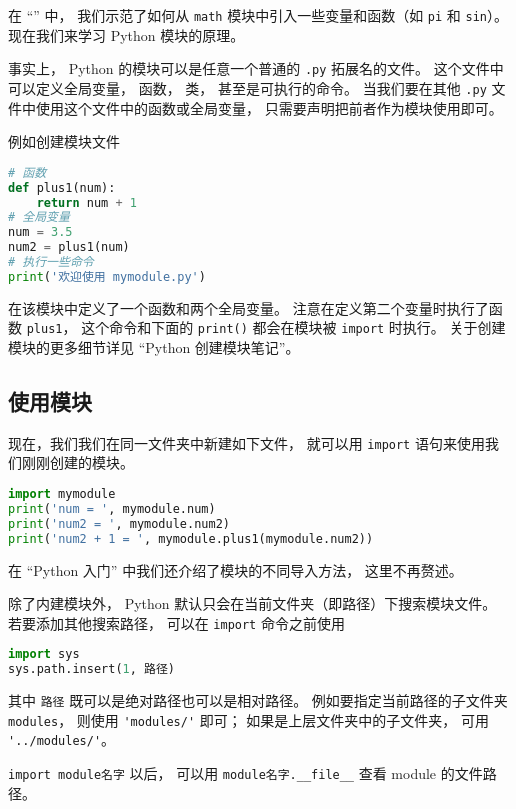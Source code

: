 

在 “” 中， 我们示范了如何从 \verb|math| 模块中引入一些变量和函数（如 \verb|pi| 和 \verb|sin|）。 现在我们来学习 Python 模块的原理。

事实上， Python 的模块可以是任意一个普通的 \verb|.py| 拓展名的文件。 这个文件中可以定义全局变量， 函数， 类， 甚至是可执行的命令。 当我们要在其他 \verb|.py| 文件中使用这个文件中的函数或全局变量， 只需要声明把前者作为模块使用即可。

例如创建模块文件
\begin{lstlisting}[language=python,caption=mymodule.py]
# 函数
def plus1(num):
    return num + 1
# 全局变量
num = 3.5
num2 = plus1(num)
# 执行一些命令
print('欢迎使用 mymodule.py')
\end{lstlisting}
在该模块中定义了一个函数和两个全局变量。 注意在定义第二个变量时执行了函数 \verb|plus1|， 这个命令和下面的 \verb|print()| 都会在模块被 \verb|import| 时执行。 关于创建模块的更多细节详见 “Python 创建模块笔记”。

\subsection{使用模块}
现在，我们我们在同一文件夹中新建如下文件， 就可以用 \verb|import| 语句来使用我们刚刚创建的模块。
\begin{lstlisting}[language=python,caption=test.py]
import mymodule
print('num = ', mymodule.num)
print('num2 = ', mymodule.num2)
print('num2 + 1 = ', mymodule.plus1(mymodule.num2))
\end{lstlisting}
在 “Python 入门” 中我们还介绍了模块的不同导入方法， 这里不再赘述。

除了内建模块外， Python 默认只会在当前文件夹（即路径）下搜索模块文件。 若要添加其他搜索路径， 可以在 \verb|import| 命令之前使用
\begin{lstlisting}[language=python]
import sys
sys.path.insert(1, 路径)
\end{lstlisting}
其中 \verb|路径| 既可以是绝对路径也可以是相对路径。 %
例如要指定当前路径的子文件夹 \verb|modules|， 则使用 \verb|'modules/'| 即可； 如果是上层文件夹中的子文件夹， 可用 \verb|'../modules/'|。

\verb|import module名字| 以后， 可以用 \verb|module名字.__file__| 查看 module 的文件路径。

